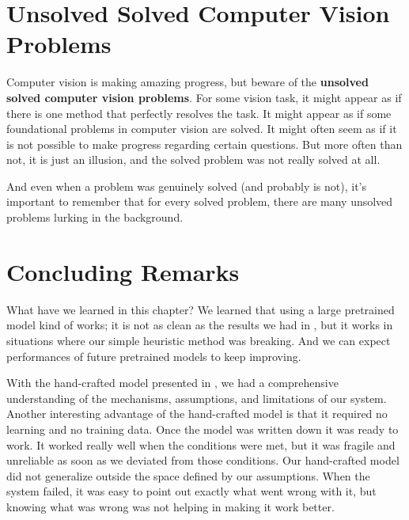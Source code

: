 \section{Unsolved Solved Computer Vision Problems}

Computer vision is making amazing progress, but beware of the {\bf unsolved solved computer vision problems}. For some vision task, it might appear as if there is one method that perfectly resolves the task. It might appear as if some foundational problems in computer vision are solved. It might often seem as if it is not possible to make progress regarding certain questions. But more often than not, it is just an illusion, and the solved problem was not really solved at all.

And even when a problem was genuinely solved (and probably is not), it's important to remember that for every solved problem, there are many unsolved problems lurking in the background.


\section{Concluding Remarks}

What have we learned in this chapter? We learned that using a large pretrained model kind of works; it is not as clean as the results we had in \chap{\ref{chapter:simplesystem}}, but it works in situations where our simple heuristic method was breaking. And we can expect performances of future pretrained models to keep improving.

With the hand-crafted model presented in \chap{\ref{chapter:simplesystem}}, we had a comprehensive understanding of the mechanisms, assumptions, and limitations of our system. Another interesting advantage of the hand-crafted model is that it required no learning and no training data. Once the model was written down it was ready to work. It worked really well when the conditions were met, but it was fragile and unreliable as soon as we deviated from those conditions. Our hand-crafted model did not generalize outside the space defined by our assumptions. When the system failed, it was easy to point out exactly what went wrong with it, but knowing what was wrong was not helping in making it work better.

